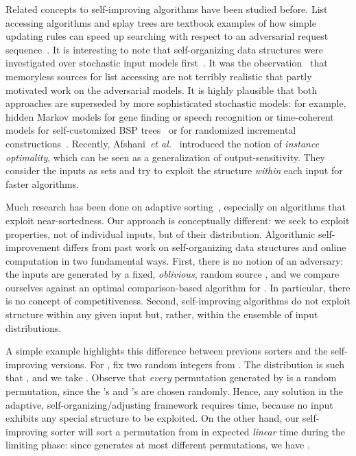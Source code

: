 \documentclass{siamltex}
\newcommand{\etal}{\emph{et al.}}
\begin{document}
Related concepts to self-improving algorithms
have been studied before.
List accessing algorithms and splay trees
are textbook examples of how simple updating
rules can speed up searching with respect
to an adversarial request 
sequence~\cite{sleatorTpage,sleatorT85,
albersW98,borodinE,hesterH}.
It is interesting to note that 
self-organizing data structures were
investigated over stochastic input 
models first~\cite{albersM98,allenM78,bitner,gonnetMS,mccabe,rivest}.
It was the observation~\cite{bentleyM} that 
memoryless sources for list accessing are not terribly
realistic that partly motivated work on the adversarial models.
It is highly plausible that both approaches are superseded by
more sophisticated stochastic models: for example,
hidden Markov models for gene finding or speech recognition
or time-coherent models for self-customized BSP trees~\cite{arCT}
or for randomized incremental constructions~\cite{ChazelleMu09b}.
Recently, Afshani~\etal~\cite{AfshaniBaCh09} introduced
the notion of \emph{instance optimality}, which can be
seen as a generalization of output-sensitivity. They consider
the inputs as sets and try to exploit the structure \emph{within}
each input for faster algorithms.

Much research has been done on adaptive sorting~\cite{EstivillW},
especially on algorithms that exploit near-sortedness. 
Our approach is conceptually different: we seek to exploit
properties, not of individual inputs, but of their distribution.
Algorithmic self-improvement differs from past work on
self-organizing data structures and online computation in two 
fundamental ways.
First, there is no notion of an adversary: the inputs are generated by
a fixed, \emph{oblivious}, random source , and we compare ourselves
against an optimal comparison-based algorithm for . In 
particular, there is  no concept of competitiveness.
Second, self-improving algorithms do not exploit structure within 
any given input
but, rather, within the ensemble of input distributions. 

A simple example highlights this difference between previous sorters
and the self-improving versions. For , fix two random 
integers 
from . The distribution  is such
that , and
we take .
Observe that \emph{every} permutation generated by 
is a random permutation, since the 's and 's are
chosen randomly.
Hence, any solution in the adaptive, self-organizing/adjusting framework
requires  time, because no input
 exhibits any special structure to be exploited. 
On the other hand, our self-improving sorter
will sort a permutation from  in expected \emph{linear} time
during the limiting phase: since  generates
at most  different permutations, we have .
\end{document}
